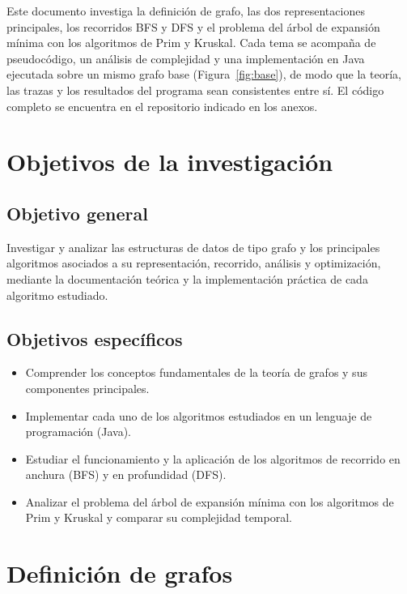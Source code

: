\documentclass[conference]{IEEEtran}
\begin{document}
Este documento investiga la definición de grafo, las dos representaciones principales, los recorridos BFS y DFS y el problema del árbol de expansión mínima con los algoritmos de Prim y Kruskal. Cada tema se acompaña de pseudocódigo, un análisis de complejidad y una implementación en Java ejecutada sobre un mismo grafo base (Figura~\ref{fig:base}), de modo que la teoría, las trazas y los resultados del programa sean consistentes entre sí. El código completo se encuentra en el repositorio indicado en los anexos.

\section{Objetivos de la investigación}
\subsection{Objetivo general}
Investigar y analizar las estructuras de datos de tipo grafo y los principales algoritmos asociados a su representación, recorrido, análisis y optimización, mediante la documentación teórica y la implementación práctica de cada algoritmo estudiado.

\subsection{Objetivos específicos}
\begin{itemize}
  \item Comprender los conceptos fundamentales de la teoría de grafos y sus componentes principales.
  \item Implementar cada uno de los algoritmos estudiados en un lenguaje de programación (Java).
  \item Estudiar el funcionamiento y la aplicación de los algoritmos de recorrido en anchura (BFS) y en profundidad (DFS).
  \item Analizar el problema del árbol de expansión mínima con los algoritmos de Prim y Kruskal y comparar su complejidad temporal.
\end{itemize}

\section{Definición de grafos}
\end{document}
